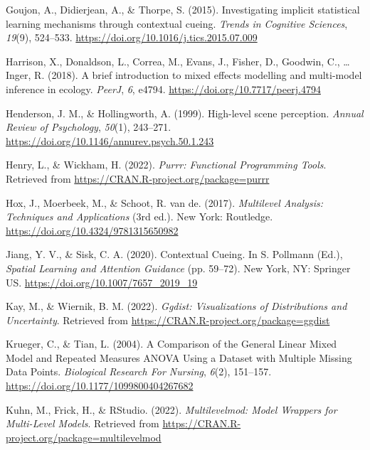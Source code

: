 \documentclass[
  man,floatsintext]{apa7}
\newlength{\cslhangindent}
\newlength{\cslentryspacingunit} %
\newenvironment{CSLReferences}[2] %
 {%
  \setlength{\parindent}{0pt}
  \ifodd #1
  \let\oldpar\par
  \def\par{\hangindent=\cslhangindent\oldpar}
  \fi
  \setlength{\parskip}{#2\cslentryspacingunit}
 }%
 {}
\begin{document}
\begin{CSLReferences}{1}{0}
\leavevmode{}%
Goujon, A., Didierjean, A., \& Thorpe, S. (2015). Investigating implicit statistical learning mechanisms through contextual cueing. \emph{Trends in Cognitive Sciences}, \emph{19}(9), 524--533. \url{https://doi.org/10.1016/j.tics.2015.07.009}

\leavevmode{}%
Harrison, X., Donaldson, L., Correa, M., Evans, J., Fisher, D., Goodwin, C., \ldots{} Inger, R. (2018). A brief introduction to mixed effects modelling and multi-model inference in ecology. \emph{PeerJ}, \emph{6}, e4794. \url{https://doi.org/10.7717/peerj.4794}

\leavevmode{}%
Henderson, J. M., \& Hollingworth, A. (1999). High-level scene perception. \emph{Annual Review of Psychology}, \emph{50}(1), 243--271. \url{https://doi.org/10.1146/annurev.psych.50.1.243}

\leavevmode{}%
Henry, L., \& Wickham, H. (2022). \emph{Purrr: {Functional} {Programming} {Tools}}. Retrieved from \url{https://CRAN.R-project.org/package=purrr}

\leavevmode{}%
Hox, J., Moerbeek, M., \& Schoot, R. van de. (2017). \emph{Multilevel {Analysis}: {Techniques} and {Applications}} (3rd ed.). New York: Routledge. \url{https://doi.org/10.4324/9781315650982}

\leavevmode{}%
Jiang, Y. V., \& Sisk, C. A. (2020). Contextual {Cueing}. In S. Pollmann (Ed.), \emph{Spatial {Learning} and {Attention} {Guidance}} (pp. 59--72). New York, NY: Springer US. \url{https://doi.org/10.1007/7657_2019_19}

\leavevmode{}%
Kay, M., \& Wiernik, B. M. (2022). \emph{Ggdist: {Visualizations} of {Distributions} and {Uncertainty}}. Retrieved from \url{https://CRAN.R-project.org/package=ggdist}

\leavevmode{}%
Krueger, C., \& Tian, L. (2004). A {Comparison} of the {General} {Linear} {Mixed} {Model} and {Repeated} {Measures} {ANOVA} {Using} a {Dataset} with {Multiple} {Missing} {Data} {Points}. \emph{Biological Research For Nursing}, \emph{6}(2), 151--157. \url{https://doi.org/10.1177/1099800404267682}

\leavevmode{}%
Kuhn, M., Frick, H., \& RStudio. (2022). \emph{Multilevelmod: {Model} {Wrappers} for {Multi}-{Level} {Models}}. Retrieved from \url{https://CRAN.R-project.org/package=multilevelmod}


\end{CSLReferences}
\end{document}
